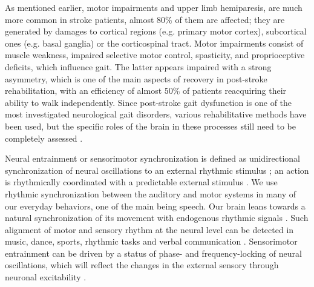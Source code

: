 As mentioned earlier, motor impairments and upper limb hemiparesis, are much more common in stroke patients, almost 80\% of them are affected; they are generated by damages to cortical regions (e.g. primary motor cortex), subcortical ones (e.g. basal ganglia) or the corticospinal tract. Motor impairments consist of muscle weakness, impaired selective motor control, spasticity, and proprioceptive deficits, which influence gait. The latter appears impaired with a strong asymmetry, which is one of the main aspects of recovery in post-stroke rehabilitation, with an efficiency of almost 50\% of patients reacquiring their ability to walk independently. Since post-stroke gait dysfunction is one of the most investigated neurological gait disorders, various rehabilitative methods have been used, but the specific roles of the brain in these processes still need to be completely assessed \parencite{Balaban_2014}. 


Neural entrainment or sensorimotor synchronization is defined as unidirectional synchronization of neural oscillations to an external rhythmic stimulus \parencite{Lakatos_2019, Haegens_2018}; an action is rhythmically coordinated with a predictable external stimulus \parencite{Pressing_1999}. We use rhythmic synchronization between the auditory and motor systems in many of our everyday behaviors, one of the main being speech. Our brain leans towards a natural synchronization of its movement with endogenous rhythmic signals \parencite{Large_2009}. Such alignment of motor and sensory rhythm at the neural level can be detected in music, dance, sports, rhythmic tasks and verbal communication \parencite{Rosso_2023}. Sensorimotor entrainment can be driven by a status of phase- and frequency-locking of neural oscillations, which will reflect the changes in the external sensory through neuronal excitability  \parencite{Lakatos_2005}. 

